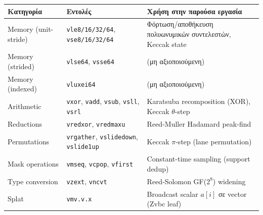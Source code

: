 \begin{tabular}{p{3.2cm}p{4.5cm}p{5.5cm}}
  \toprule
  \textbf{Κατηγορία} & \textbf{Εντολές} & \textbf{Χρήση στην παρούσα εργασία} \\
  \midrule
  Memory (unit-stride) &
    \texttt{vle8/16/32/64}, \texttt{vse8/16/32/64} &
    Φόρτωση/αποθήκευση πολυωνυμικών συντελεστών, Keccak state \\
  \addlinespace
  Memory (strided) &
    \texttt{vlse64}, \texttt{vsse64} &
    (μη αξιοποιούμενη) \\
  \addlinespace
  Memory (indexed) &
    \texttt{vluxei64} &
    (μη αξιοποιούμενη) \\
  \addlinespace
  Arithmetic &
    \texttt{vxor}, \texttt{vadd}, \texttt{vsub}, \texttt{vsll}, \texttt{vsrl} &
    Karatsuba recomposition (XOR), Keccak $\theta$-step \\
  \addlinespace
  Reductions &
    \texttt{vredxor}, \texttt{vredmaxu} &
    Reed-Muller Hadamard peak-find \\
  \addlinespace
  Permutations &
    \texttt{vrgather}, \texttt{vslidedown}, \texttt{vslide1up} &
    Keccak $\pi$-step (lane permutation) \\
  \addlinespace
  Mask operations &
    \texttt{vmseq}, \texttt{vcpop}, \texttt{vfirst} &
    Constant-time sampling (support dedup) \\
  \addlinespace
  Type conversion &
    \texttt{vzext}, \texttt{vncvt} &
    Reed-Solomon GF($2^8$) widening \\
  \addlinespace
  Splat &
    \texttt{vmv.v.x} &
    Broadcast scalar $a[i]$ σε vector (Zvbc leaf) \\
  \bottomrule
\end{tabular}
